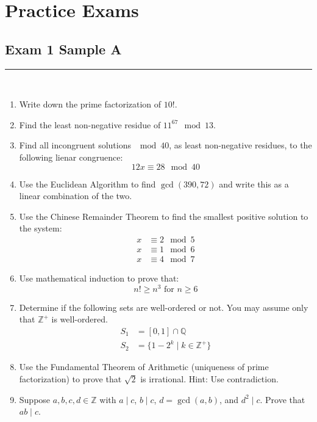 \documentclass[class=article, crop=false]{standalone}
\def\integers{{\mathbb Z}}
\def\rationals{{\mathbb Q}}
\begin{document}
\section*{Practice Exams}

\subsection*{Exam 1 Sample A}
\rule{\textwidth}{1pt}\\
\begin{enumerate}[1.]
	\item Write down the prime factorization of $10!$.
	
	\item Find the least non-negative residue of $11^{67} \mod 13$.
	
	\item Find all incongruent solutions $\mod 40$, as least non-negative residues,
	to the following lienar congruence: $$12x\equiv 28\mod 40$$

	\item Use the Euclidean Algorithm to find $\gcd (390,72)$ and write this as a linear
	combination of the two.

	\item Use the Chinese Remainder Theorem to find the smallest positive solution to the
	system:
	\begin{align*}
		x &\equiv 2\mod 5 \\
		x &\equiv 1\mod 6 \\
		x &\equiv 4\mod 7
	\end{align*}

	\item Use mathematical induction to prove that: $$n!\geq n^3 \text{ for } n\geq 6$$

	\item Determine if the following sets are well-ordered or not.
	You may assume only that $\integers^+$ is well-ordered.
	\begin{align*}
		S_1 &= [0,1]\cap \rationals \\
		S_2 &= \{1-2^k \mid k\in\integers^+ \}
	\end{align*}

	\item Use the Fundamental Theorem of Arithmetic (uniqueness of prime factorization) to prove
	that $\sqrt{2}$ is irrational. Hint: Use contradiction.

	\item Suppose $a,b,c,d\in\integers$ with $a\mid c$, $b\mid c$, $d=\gcd(a,b)$, and $d^2\mid c$.
	Prove that $ab\mid c$.
\end{enumerate}
\end{document}
